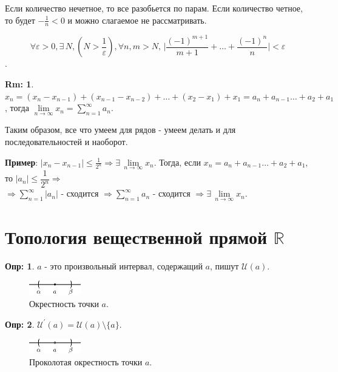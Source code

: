 \documentclass[12pt]{article}
\theoremstyle{definition}
\newtheorem{defn}{Опр:}
\newtheorem{rem}{Rm:}
\begin{document}
Если количество нечетное, то все разобьется по парам. Если количество четное, то будет $-\frac{1}{n} <0$ и можно слагаемое не рассматривать.

$$\forall \varepsilon > 0, \exists \, N, (N > \frac{1}{\varepsilon}), \forall n,m > N, \, \bigg|\dfrac{(-1)^{m+1}}{m+1} + \dotsc + \dfrac{(-1)^n}{n} \bigg| < \varepsilon$$.
 
\begin{rem}
	$x_n = (x_n - x_{n-1}) + (x_{n-1} - x_{n-2}) + \dotsc + (x_2 - x_1) + x_1 = a_n + a_{n-1} \dotsc + a_2 + a_1$, тогда $\lim\limits_{n \to \infty} x_n = \sum\limits_{n=1}^{\infty} a_n$.
\end{rem}

Таким образом, все что умеем для рядов - умеем делать и для последовательностей и наоборот.

\textbf{Пример}: $|x_n - x_{n-1}| \leq \frac{1}{2^n} \Rightarrow \exists\, \lim\limits_{n\to \infty} x_n$. Тогда, если $x_n =a_n + a_{n-1} \dotsc + a_2 + a_1$, то $|a_n| \leq \dfrac{1}{2^n} \Rightarrow$ \\
$\Rightarrow \displaystyle \sum\limits_{n=1}^{\infty} |a_n|$ - сходится $\Rightarrow \displaystyle \sum\limits_{n=1}^{\infty} a_n$ - сходится $\Rightarrow \exists\, \lim\limits_{n\to \infty} x_n$.

\newpage

\section*{Топология вещественной прямой $\mathbb{R}$}

\begin{defn}
	 $a$ - это произвольный интервал, содержащий $a$, пишут $\mathcal{U}(a)$.
\end{defn}

\begin{figure}[H]
	\centering
	\includegraphics[width=0.2\textwidth]{11_1.eps}
	\caption{Окрестность точки $a$.}
	\label{11_1}
\end{figure}

\begin{defn}
	 $\mathcal{U}^\prime(a) = \mathcal{U}(a) \setminus \{a\}$.
\end{defn}

\begin{figure}[H]
	\centering
	\includegraphics[width=0.2\textwidth]{11_2.eps}
	\caption{Проколотая окрестность точки $a$.}
	\label{11_2}
\end{figure}
\end{document}
